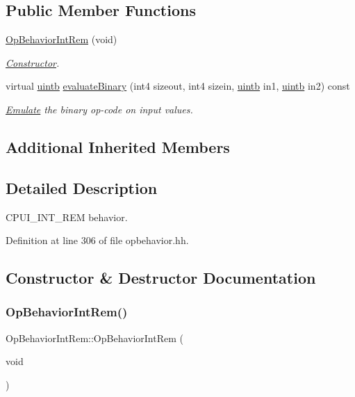 \subsection*{Public Member Functions}
\begin{DoxyCompactItemize}
\item 
\mbox{\hyperlink{class_op_behavior_int_rem_a783f1c568cd0f19ca5632610702289a5}{Op\+Behavior\+Int\+Rem}} (void)
\begin{DoxyCompactList}\small\item\em \mbox{\hyperlink{class_constructor}{Constructor}}. \end{DoxyCompactList}\item 
virtual \mbox{\hyperlink{types_8h_a2db313c5d32a12b01d26ac9b3bca178f}{uintb}} \mbox{\hyperlink{class_op_behavior_int_rem_a8b8b62458f32a4dc99fbf054d2b77d45}{evaluate\+Binary}} (int4 sizeout, int4 sizein, \mbox{\hyperlink{types_8h_a2db313c5d32a12b01d26ac9b3bca178f}{uintb}} in1, \mbox{\hyperlink{types_8h_a2db313c5d32a12b01d26ac9b3bca178f}{uintb}} in2) const
\begin{DoxyCompactList}\small\item\em \mbox{\hyperlink{class_emulate}{Emulate}} the binary op-\/code on input values. \end{DoxyCompactList}\end{DoxyCompactItemize}
\subsection*{Additional Inherited Members}


\subsection{Detailed Description}
C\+P\+U\+I\+\_\+\+I\+N\+T\+\_\+\+R\+EM behavior. 

Definition at line 306 of file opbehavior.\+hh.



\subsection{Constructor \& Destructor Documentation}
\mbox{\label{class_op_behavior_int_rem_a783f1c568cd0f19ca5632610702289a5}} 
\subsubsection{\texorpdfstring{OpBehaviorIntRem()}{OpBehaviorIntRem()}}
{\footnotesize\ttfamily Op\+Behavior\+Int\+Rem\+::\+Op\+Behavior\+Int\+Rem (\begin{DoxyParamCaption}\item[{void}]{ }\end{DoxyParamCaption})\hspace{0.3cm}{\ttfamily [inline]}}



